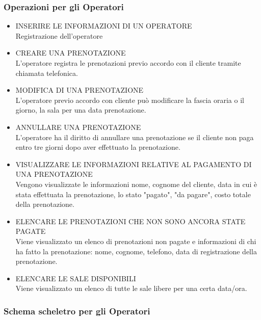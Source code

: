 \documentclass{article}
\newcounter{counteroperazioni}
\newcommand{\coperazioni}{\addtocounter{counteroperazioni}{1}\thecounteroperazioni}
\begin{document}
\subsubsection{Operazioni per gli Operatori}
\begin{itemize}[labelindent=1.5em,labelsep=.5cm,leftmargin=*]
    \item [\textbf{O\coperazioni)}] INSERIRE LE INFORMAZIONI DI UN OPERATORE \\ Registrazione dell'operatore
    \item [\textbf{O\coperazioni)}] CREARE UNA PRENOTAZIONE \\ L'operatore registra le prenotazioni previo accordo con il cliente tramite chiamata telefonica.
    \item [\textbf{O\coperazioni)}] MODIFICA DI UNA PRENOTAZIONE\\ L'operatore previo accordo con cliente può modificare la fascia oraria o il giorno, la sala per una data prenotazione.
    \item [\textbf{O\coperazioni)}] ANNULLARE UNA PRENOTAZIONE \\ L'operatore ha il diritto di annullare una prenotazione se il cliente non paga entro tre giorni dopo aver effettuato la prenotazione.
    \item [\textbf{O\coperazioni)}] VISUALIZZARE LE INFORMAZIONI RELATIVE AL PAGAMENTO DI UNA PRENOTAZIONE \\ Vengono visualizzate le informazioni nome, cognome del cliente, data in cui è stata effettuata la prenotazione, lo stato "pagato", "da pagare", costo totale della prenotazione. 
    \item [\textbf{O\coperazioni)}] ELENCARE LE PRENOTAZIONI CHE NON SONO ANCORA STATE PAGATE \\ Viene visualizzato un elenco di prenotazioni non pagate e informazioni di chi ha fatto la prenotazione: nome, cognome, telefono, data di registrazione della prenotazione.
    \item [\textbf{O\coperazioni)}] ELENCARE LE SALE DISPONIBILI \\ Viene visualizzato un elenco di tutte le sale libere per una certa data/ora.
\end{itemize}

\subsubsection{Schema scheletro per gli Operatori}
\begin{center}
    
\end{center}
\end{document}
